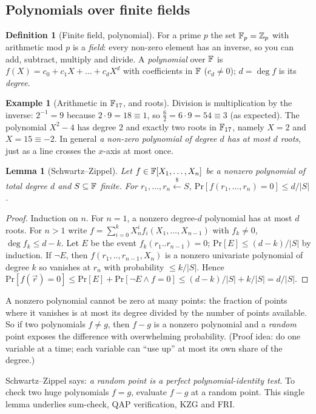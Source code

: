 \documentclass[11pt,a4paper]{report}
\theoremstyle{plain}
\newtheorem{lemma}[theorem]{Lemma}
\theoremstyle{definition}
\newtheorem{definition}[theorem]{Definition}
\newtheorem{example}[theorem]{Example}
\theoremstyle{remark}
\newcommand{\getsr}{\xleftarrow{\$}}
\renewcommand{\Pr}{\mathrm{Pr}}
\newcommand{\Z}[1]{\ZZ_{#1}}
\begin{document}
\subsection{Polynomials over finite fields}
\begin{definition}[Finite field, polynomial]
For a prime $p$ the set $\FF_p=\Z p$ with arithmetic mod $p$ is a \emph{field}: every non-zero element has an inverse, so you can add, subtract, multiply and divide. A \emph{polynomial} over $\mathbb{F}$ is $f(X)=c_0+c_1X+\dots+c_dX^d$ with coefficients in $\mathbb{F}$ ($c_d\neq0$); $d=\deg f$ is its \emph{degree}.
\end{definition}
\begin{example}[Arithmetic in $\mathbb{F}_{17}$, and roots]
Division is multiplication by the inverse: $2^{-1}=9$ because $2\cdot9=18\equiv1$, so $\tfrac{6}{2}=6\cdot9=54\equiv3$ (as expected). The polynomial $X^2-4$ has degree $2$ and exactly two roots in $\mathbb{F}_{17}$, namely $X=2$ and $X=15\equiv-2$. In general \emph{a non-zero polynomial of degree $d$ has at most $d$ roots}, just as a line crosses the $x$-axis at most once.
\end{example}
\begin{lemma}[Schwartz--Zippel]\label{lem:sz}
Let $f\in\mathbb{F}[X_1,\dots,X_n]$ be a nonzero polynomial of total degree $d$ and $S\subseteq\mathbb{F}$ finite. For $r_1,\dots,r_n\getsr S$, $\Pr[f(r_1,\dots,r_n)=0]\le d/|S|$.
\end{lemma}
\begin{proof}
Induction on $n$. For $n=1$, a nonzero degree-$d$ polynomial has at most $d$ roots. For $n>1$ write $f=\sum_{i=0}^{k}X_n^i f_i(X_1,\dots,X_{n-1})$ with $f_k\ne0$, $\deg f_k\le d-k$. Let $E$ be the event $f_k(r_1..r_{n-1})=0$; $\Pr[E]\le(d-k)/|S|$ by induction. If $\neg E$, then $f(r_1,..,r_{n-1},X_n)$ is a nonzero univariate polynomial of degree $k$ so vanishes at $r_n$ with probability $\le k/|S|$. Hence $\Pr[f(\vec r)=0]\le\Pr[E]+\Pr[\neg E\wedge f=0]\le(d-k)/|S|+k/|S|=d/|S|$.
\end{proof}
\begin{plain}\PE
A nonzero polynomial cannot be zero at many points: the fraction of points where it vanishes is at most its degree divided by the number of points available. So if two polynomials $f\ne g$, then $f-g$ is a nonzero polynomial and a \emph{random} point exposes the difference with overwhelming probability. (Proof idea: do one variable at a time; each variable can ``use up'' at most its own share of the degree.)
\end{plain}
\begin{intuition}
Schwartz--Zippel says: \emph{a random point is a perfect polynomial-identity test}. To check two huge polynomials $f=g$, evaluate $f-g$ at a random point. This single lemma underlies sum-check, QAP verification, KZG and FRI.
\end{intuition}
\end{document}
